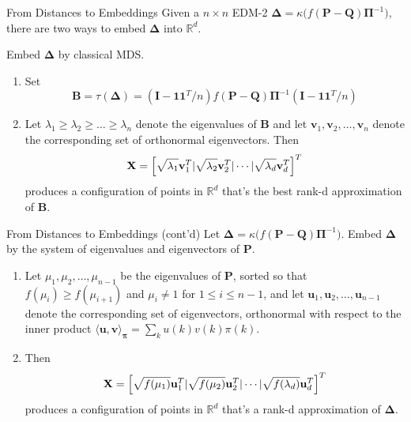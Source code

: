 \documentclass[professionalfonts,hyperref={pdfpagelabels=false,colorlinks=true,linkcolor=red}]{beamer}
\begin{document}
\begin{frame}{From Distances to Embeddings}
  Given a $n \times n$ EDM-2 $\bm{\Delta} = \kappa\bigl(f(\mathbf{P} -
  \mathbf{Q})\bm{\Pi}^{-1}\bigr)$, there are two ways to embed
  $\bm{\Delta}$ into $\mathbb{R}^{d}$. 
  
  \vskip10pt Embed $\bm{\Delta}$ by classical MDS.  
  \begin{enumerate}
  \item Set 
    \begin{equation*}
      \mathbf{B} = \tau(\bm{\Delta}) = (\mathbf{I} -
      \bm{1}\bm{1}^{T}/n) f(\mathbf{P} - \mathbf{Q})\bm{\Pi}^{-1} (\mathbf{I} -
      \bm{1}\bm{1}^{T}/n)
    \end{equation*}
  \item Let $\lambda_1 \geq \lambda_2 \geq \dots \geq \lambda_n$
    denote the eigenvalues of $\mathbf{B}$ and let $\bm{v}_1,
    \bm{v}_2, \dots, \bm{v}_n$ denote the corresponding set of
    orthonormal eigenvectors. Then
    \begin{equation*}
      \mathbf{X} = \Bigl[ \sqrt{\lambda_1} \mathbf{v}_1^{T} |
      \sqrt{\lambda_2} \mathbf{v}_{2}^{T} | \cdots |
      \sqrt{\lambda_d} \mathbf{v}_d^{T} \Bigr]^{T}
    \end{equation*}
    produces a configuration of points in $\mathbb{R}^{d}$ that's
    the \alert{best rank-d approximation} of $\mathbf{B}$. 
  \end{enumerate}
\end{frame}
    
\begin{frame}{From Distances to Embeddings (cont'd)}
  Let $\bm{\Delta} = \kappa\bigl(f(\mathbf{P} -
  \mathbf{Q})\bm{\Pi}^{-1}\bigr)$. Embed $\bm{\Delta}$ by the system
  of eigenvalues and eigenvectors of $\mathbf{P}$.
  \begin{enumerate}
  \item Let $\mu_1, \mu_2, \dots, \mu_{n-1}$ be the eigenvalues of
    $\mathbf{P}$, sorted so that $f(\mu_{i}) \geq f(\mu_{i+1})$ and
    $\mu_i \not= 1$ for $1 \leq i \leq n - 1$, and let $\bm{u}_1,
    \bm{u}_2, \dots, \bm{u}_{n-1}$ denote the corresponding set of
    eigenvectors, orthonormal with respect to the inner product
    $\langle
    \bm{u}, \bm{v} \rangle_{\bm{\pi}} = \sum_{k}{u(k) v(k) \pi(k)}$.
  \item Then
    \begin{equation*}
      \mathbf{X} = \Bigl[ \sqrt{f(\mu_1)} \mathbf{u}_1^{T} |
      \sqrt{f(\mu_2)} \mathbf{u}_{2}^{T} | \cdots |
      \sqrt{f(\lambda_d)} \mathbf{u}_d^{T} \Bigr]^{T}
    \end{equation*}
    produces a configuration of points in $\mathbb{R}^{d}$ that's a
    rank-d approximation of $\bm{\Delta}$. 
  \end{enumerate}
\end{frame}

\begin{frame}

\end{frame}
\end{document}
